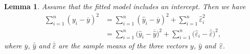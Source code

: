 \documentclass[
  a4paper,
]{article}
\newtheorem{lemma}{Lemma}[section]
\theoremstyle{definition}
\theoremstyle{definition}
\theoremstyle{definition}
\theoremstyle{definition}
\theoremstyle{remark}
\begin{document}
\begin{lemma}
\protect\hypertarget{lem:explained-variance}{}\label{lem:explained-variance}Assume that the fitted model includes an intercept. Then we have
\begin{align*}
  \sum_{i=1}^n (y_i - \overline{y})^2
  &= \sum_{i=1}^n (\hat y_i - \overline{y})^2
    + \sum_{i=1}^n \hat \varepsilon_i^2 \\
  &= \sum_{i=1}^n \bigl( \hat y_i - \overline{\hat y} \bigr)^2
    + \sum_{i=1}^n \bigl( \hat \varepsilon_i - \overline{\hat\varepsilon} \bigr)^2,
\end{align*}
where \(\overline{y}\), \(\overline{\hat y}\) and \(\overline{\hat\varepsilon}\)
are the sample means of the three vectors \(y\), \(\hat y\) and~\(\hat\varepsilon\).
\end{lemma}
\end{document}
